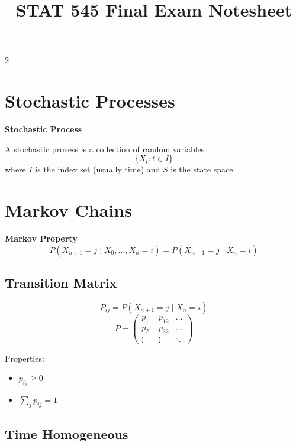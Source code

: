 \documentclass[10pt]{article}
\title{\vspace{-1cm}STAT 545 Final Exam Notesheet}
\date{}
\begin{document}
\maketitle
\vspace{-1.1cm}

\begin{multicols}{2}

\section{Stochastic Processes}

\begin{definitionbox}
\textbf{Stochastic Process}

A stochastic process is a collection of random variables
\[
\{X_t : t \in I\}
\]
where \(I\) is the index set (usually time) and \(S\) is the state space.
\end{definitionbox}

\section{Markov Chains}

\begin{definitionbox}
\textbf{Markov Property}
\[
P(X_{n+1}=j \mid X_0,\dots,X_n=i)
=
P(X_{n+1}=j \mid X_n=i)
\]
\end{definitionbox}

\subsection{Transition Matrix}

\begin{formulabox}
\[
P_{ij} = P(X_{n+1}=j \mid X_n=i)
\]
\[
P =
\begin{pmatrix}
p_{11} & p_{12} & \dots \\
p_{21} & p_{22} & \dots \\
\vdots & \vdots & \ddots
\end{pmatrix}
\]
\end{formulabox}

Properties:
\begin{itemize}[leftmargin=12pt,itemsep=1pt]
\item \(p_{ij}\ge 0\)
\item \(\sum_j p_{ij}=1\)
\end{itemize}

\subsection{Time Homogeneous}


\end{multicols}
\end{document}
